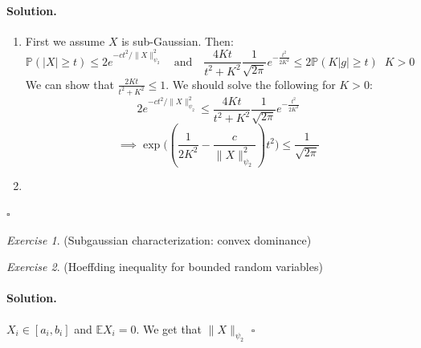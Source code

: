 \documentclass[11pt]{article}
\theoremstyle{definition}
\theoremstyle{remark}
\newtheorem{exercise}{Exercise}[section]
\newenvironment{solution}{\paragraph{Solution.}}{\hfill$\square$\medskip}
\newcommand{\E}{\mathbb{E}}
\newcommand{\Prob}{\mathbb{P}}
\newcommand{\1}{\mathbf{1}}
\newcommand{\subg}{{\psi_2}}
\begin{document}
\begin{solution}
	\begin{enumerate}
		\item 
		First we assume \(X\) is sub-Gaussian. Then: 
		\[
		\Prob( |X| \geq t ) \leq 2 e^{-ct^2 / \|X\|_\subg^2}
		\quad \text{and} \quad
	   	\frac{4Kt}{t^2 + K^2}  \frac{1}{\sqrt{2\pi}} e^{-\frac{t^2}{2K^2}} \leq 2\Prob( K|g| \geq t) \;\; K > 0
		\]
		We can show that \(\frac{2Kt}{t^2 + K^2}  \leq 1\). We should solve the following for \(K>0\):
		\[
		 2 e^{-ct^2 / \|X\|_\subg^2}
		\leq
		\frac{4Kt}{t^2 + K^2}  \frac{1}{\sqrt{2\pi}} e^{-\frac{t^2}{2K^2}} 
		\]
		\[
		\implies \exp \big( (\frac{1}{2K^2} - \frac{c}{\|X\|_\subg^2})t^2 \big) \leq \frac{1}{\sqrt{2\pi}}
		\]
	
		\item 
		
		
	\end{enumerate}
\end{solution}

\begin{exercise}
	(Subgaussian characterization: convex dominance)
\end{exercise}

\begin{exercise}
	(Hoeffding inequality for bounded random variables)
\end{exercise}
\begin{solution}
	\(X_i \in [a_i,b_i]\) and \(\E X_i = 0\). We get that \(\|X\|_\subg\)
\end{solution}
\end{document}
